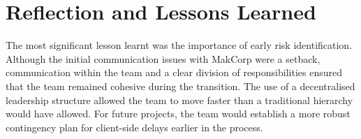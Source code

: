 \section{Reflection and Lessons Learned}

The most significant lesson learnt was the importance of early risk identification.
Although the initial communication issues with MakCorp were a setback, communication within
the team and a clear division of responsibilities ensured that the team remained cohesive during
the transition. The use of a decentralised leadership structure allowed the team to move
faster than a traditional hierarchy would have allowed. For future projects, the team would
establish a more robust contingency plan for client-side delays earlier in the process.
